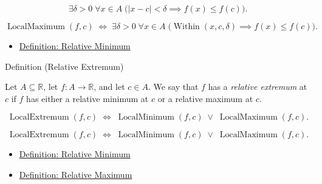 \begin{remark*}
\[
\exists \delta > 0\;\forall x \in A\;
\bigl(|x - c| < \delta \implies f(x) \leq f(c)\bigr).
\]
\end{remark*}

\begin{remark*}
\[
\operatorname{LocalMaximum}(f, c)
\;\Longleftrightarrow\;
\exists \delta > 0\;\forall x \in A\;
\bigl(\operatorname{Within}(x, c, \delta) \implies f(x) \leq f(c)\bigr).
\]
\end{remark*}

\begin{remark*}[Dependencies]
\begin{itemize}
  \item \hyperref[def:relative-minimum]{Definition: Relative Minimum}
\end{itemize}
\end{remark*}


\begin{definitionbox}{Definition (Relative Extremum)}
\begin{definition}
\label{def:relative-extremum}
Let $A \subseteq \mathbb{R}$, let $f : A \to \mathbb{R}$, and let $c \in A$. We say that $f$ has a \emph{relative extremum} at $c$ if $f$ has either a relative minimum at $c$ or a relative maximum at $c$.
\end{definition}
\end{definitionbox}

\begin{remark*}
\[
\operatorname{LocalExtremum}(f, c)
\;\Longleftrightarrow\;
\operatorname{LocalMinimum}(f, c) \;\lor\; \operatorname{LocalMaximum}(f, c).
\]
\end{remark*}

\begin{remark*}
\[
\operatorname{LocalExtremum}(f, c)
\;\Longleftrightarrow\;
\operatorname{LocalMinimum}(f, c) \;\lor\; \operatorname{LocalMaximum}(f, c).
\]
\end{remark*}

\begin{remark*}[Dependencies]
\begin{itemize}
  \item \hyperref[def:relative-minimum]{Definition: Relative Minimum}
  \item \hyperref[def:relative-maximum]{Definition: Relative Maximum}
\end{itemize}
\end{remark*}

